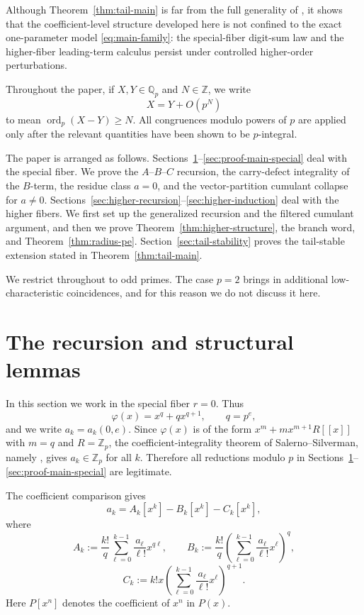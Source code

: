 \documentclass[11pt]{amsart}
\numberwithin{equation}{section}
\DeclareMathOperator{\ordop}{ord}
\newcommand{\Qp}{\mathbb{Q}_p}
\newcommand{\Zp}{\mathbb{Z}_p}
\newcommand{\bigo}{O}
\newcommand{\vp}{\ordop_p}
\begin{document}
Although Theorem~\ref{thm:tail-main} is far from the full generality of \cite{FuNie}, it shows that the coefficient-level structure developed here is not confined to the exact one-parameter model \eqref{eq:main-family}: the special-fiber digit-sum law and the higher-fiber leading-term calculus persist under controlled higher-order perturbations.

Throughout the paper, if $X,Y\in\Qp$ and $N\in\mathbb Z$, we write
\[
        X=Y+\bigo(p^N)
\]
to mean $\vp(X-Y)\ge N$.  All congruences modulo powers of $p$ are applied only after the relevant quantities have been shown to be $p$-integral.

The paper is arranged as follows.  Sections~\ref{sec:recursion}--\ref{sec:proof-main-special} deal with the special fiber.  We prove the $A$--$B$--$C$ recursion, the carry-defect integrality of the $B$-term, the residue class $a=0$, and the vector-partition cumulant collapse for $a\ne0$.  Sections~\ref{sec:higher-recursion}--\ref{sec:higher-induction} deal with the higher fibers.  We first set up the generalized recursion and the filtered cumulant argument, and then we prove Theorem~\ref{thm:higher-structure}, the branch word, and Theorem~\ref{thm:radius-pe}.  Section~\ref{sec:tail-stability} proves the tail-stable extension stated in Theorem~\ref{thm:tail-main}.

We restrict throughout to odd primes.  The case $p=2$ brings in additional low-characteristic coincidences, and for this reason we do not discuss it here.

\section{The recursion and structural lemmas}\label{sec:recursion}
In this section we work in the special fiber $r=0$.  Thus
\[
        \varphi(x)=x^q+qx^{q+1},\qquad q=p^e,
\]
and we write $a_k=a_k(0,e)$.  Since $\varphi(x)$ is of the form $x^m+mx^{m+1}R[\![x]\!]$ with $m=q$ and $R=\Zp$, the coefficient-integrality theorem of Salerno--Silverman, namely \cite[Theorem~3(b)]{SalernoSilverman}, gives $a_k\in\Zp$ for all $k$.  Therefore all reductions modulo $p$ in Sections~\ref{sec:recursion}--\ref{sec:proof-main-special} are legitimate.

The coefficient comparison gives
\begin{equation}\label{eq:ABC}
        a_k=A_k[x^k]-B_k[x^k]-C_k[x^k],
\end{equation}
where
\[
        A_k:=\frac{k!}{q}\sum_{\ell=0}^{k-1}\frac{a_\ell}{\ell!}x^{q\ell},\qquad
        B_k:=\frac{k!}{q}\left(\sum_{\ell=0}^{k-1}\frac{a_\ell}{\ell!}x^\ell\right)^q,
\]
\[
        C_k:=k!x\left(\sum_{\ell=0}^{k-1}\frac{a_\ell}{\ell!}x^\ell\right)^{q+1}.
\]
Here $P[x^n]$ denotes the coefficient of $x^n$ in $P(x)$.
\end{document}
